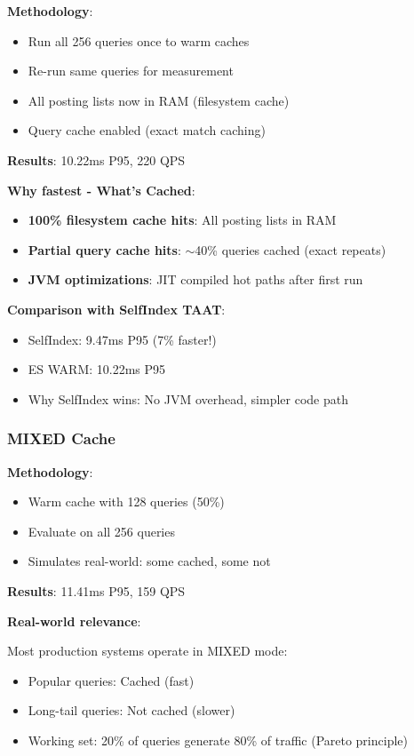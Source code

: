 \documentclass[12pt,a4paper]{article}
\begin{document}
\textbf{Methodology}:
\begin{itemize}
    \item Run all 256 queries once to warm caches
    \item Re-run same queries for measurement
    \item All posting lists now in RAM (filesystem cache)
    \item Query cache enabled (exact match caching)
\end{itemize}

\textbf{Results}: 10.22ms P95, 220 QPS

\textbf{Why fastest - What's Cached}:

\begin{itemize}
    \item \textbf{100\% filesystem cache hits}: All posting lists in RAM
    \item \textbf{Partial query cache hits}: $\sim$40\% queries cached (exact repeats)
    \item \textbf{JVM optimizations}: JIT compiled hot paths after first run
\end{itemize}

\textbf{Comparison with SelfIndex TAAT}:
\begin{itemize}
    \item SelfIndex: 9.47ms P95 (7\% faster!)
    \item ES WARM: 10.22ms P95
    \item Why SelfIndex wins: No JVM overhead, simpler code path
\end{itemize}

\subsubsection{MIXED Cache}

\textbf{Methodology}:
\begin{itemize}
    \item Warm cache with 128 queries (50\%)
    \item Evaluate on all 256 queries
    \item Simulates real-world: some cached, some not
\end{itemize}

\textbf{Results}: 11.41ms P95, 159 QPS

\textbf{Real-world relevance}:

Most production systems operate in MIXED mode:
\begin{itemize}
    \item Popular queries: Cached (fast)
    \item Long-tail queries: Not cached (slower)
    \item Working set: 20\% of queries generate 80\% of traffic (Pareto principle)
\end{itemize}
\end{document}
